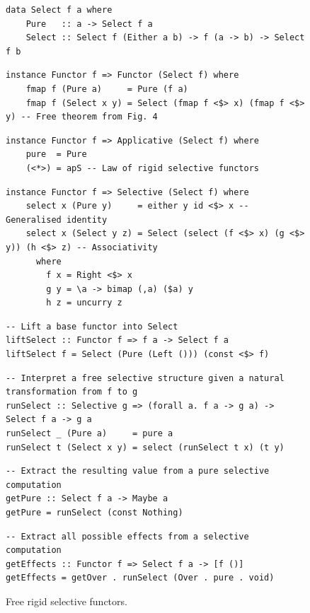 \begin{figure}
\begin{verbatim}
data Select f a where
    Pure   :: a -> Select f a
    Select :: Select f (Either a b) -> f (a -> b) -> Select f b
\end{verbatim}
\vspace{1mm}
\begin{verbatim}
instance Functor f => Functor (Select f) where
    fmap f (Pure a)     = Pure (f a)
    fmap f (Select x y) = Select (fmap f <$> x) (fmap f <$> y) -- Free theorem from Fig. 4
\end{verbatim}
\vspace{1mm}
\begin{verbatim}
instance Functor f => Applicative (Select f) where
    pure  = Pure
    (<*>) = apS -- Law of rigid selective functors
\end{verbatim}
\vspace{1mm}
\begin{verbatim}
instance Functor f => Selective (Select f) where
    select x (Pure y)     = either y id <$> x -- Generalised identity
    select x (Select y z) = Select (select (f <$> x) (g <$> y)) (h <$> z) -- Associativity
      where
        f x = Right <$> x
        g y = \a -> bimap (,a) ($a) y
        h z = uncurry z
\end{verbatim}
\vspace{1mm}
\begin{verbatim}
-- Lift a base functor into Select
liftSelect :: Functor f => f a -> Select f a
liftSelect f = Select (Pure (Left ())) (const <$> f)
\end{verbatim}
\vspace{1mm}
\begin{verbatim}
-- Interpret a free selective structure given a natural transformation from f to g
runSelect :: Selective g => (forall a. f a -> g a) -> Select f a -> g a
runSelect _ (Pure a)     = pure a
runSelect t (Select x y) = select (runSelect t x) (t y)
\end{verbatim}
\vspace{1mm}
\begin{verbatim}
-- Extract the resulting value from a pure selective computation
getPure :: Select f a -> Maybe a
getPure = runSelect (const Nothing)
\end{verbatim}
\vspace{1mm}
\begin{verbatim}
-- Extract all possible effects from a selective computation
getEffects :: Functor f => Select f a -> [f ()]
getEffects = getOver . runSelect (Over . pure . void)
\end{verbatim}
\vspace{-2mm}
\caption{Free rigid selective functors.}\label{fig-free}
\vspace{-3mm}
\end{figure}

